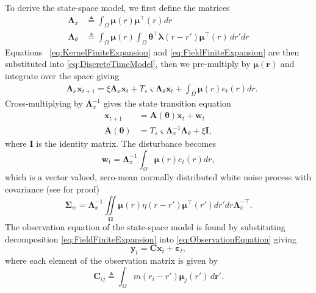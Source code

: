 \documentclass[journal]{IEEEtran}
\begin{document}
To derive the state-space model, we first define the matrices 
\begin{align}\label{eq:Lambdax}
 \mathbf{\Lambda}_{x} &\triangleq \int_{\Omega}\boldsymbol\mu\left(r\right)\boldsymbol\mu^\top\left(r\right) dr \\
\label{eq:Lambdatheta}
 \mathbf{\Lambda}_{\theta} &\triangleq \int_{\Omega}\boldsymbol\mu\left(r\right) \int_\Omega { 
	   \boldsymbol\theta^\top\boldsymbol\lambda\left(r-r'\right)
	    \boldsymbol\mu^\top\left(r\right) 
	\, dr'dr}
\end{align}
Equations ~\eqref{eq:KernelFiniteExpansion} and \eqref{eq:FieldFiniteExpansion} are then substituted into \eqref{eq:DiscreteTimeModel}, then we pre-multiply by $\boldsymbol\mu\left(\mathbf r\right)$ and integrate over the space giving
\begin{align}\label{eq:DecomposedModel2} 
	&\mathbf{\Lambda}_{x} \mathbf{x}_{t+1}= 
	\xi\mathbf{\Lambda}_{x} \mathbf{x}_t +T_s \varsigma \mathbf{\Lambda}_{\theta}\mathbf{x}_t +\int_{\Omega}\boldsymbol\mu\left(r\right)e_t\left(r\right)dr.
\end{align}
Cross-multiplying by $\mathbf{\Lambda}_{x}^{-1}$ gives the state transition equation
\begin{align}\label{eq:StateEquation}
 \mathbf x_{t+1} &=\mathbf A(\boldsymbol \theta) \mathbf x_t+ \mathbf w_t\\
\label{eq:A_theta}
 \mathbf A(\boldsymbol \theta) &= T_s\varsigma\mathbf{\Lambda}_{x}^{-1}\mathbf{\Lambda}_{\theta}+\xi\mathbf I,
\end{align}
where $\mathbf I$ is the identity matrix. The disturbance becomes 
\begin{equation}\label{eq:Disturbance}
\mathbf w_t= \mathbf{\Lambda}_{x}^{-1}\int_{\Omega}\boldsymbol\mu \left(r\right)e_t\left(r\right)dr,
\end{equation}
which is a vector valued, zero-mean normally distributed white noise process with covariance (see \cite{Scerri2009} for proof)
\begin{equation}
\boldsymbol\Sigma_w =\mathbf{\Lambda}_{x}^{-1}\iint\limits_{\boldsymbol\Omega}\boldsymbol\mu\left(r\right) \eta\left(r-r'\right)\boldsymbol\mu^{\top}\left(r'\right)dr'dr\mathbf{\Lambda}_{x}^{-\top}.
\end{equation}
The observation equation of the state-space model is found by substituting decomposition \eqref{eq:FieldFiniteExpansion}
 into \eqref{eq:ObservationEquation} giving
\begin{equation}\label{eq:ReducedObservationEquation} 
	\mathbf{y}_t = \mathbf{C}\mathbf{x}_t + \boldsymbol{\varepsilon}_t,
\end{equation}
where each element of the observation matrix is given by
\begin{equation}
	\mathbf{C}_{ij} \triangleq \int_{\Omega}m(r_i - r')\boldsymbol{\mu}_j(r') \, d\mathbf{r}'.
\end{equation}
\end{document}
